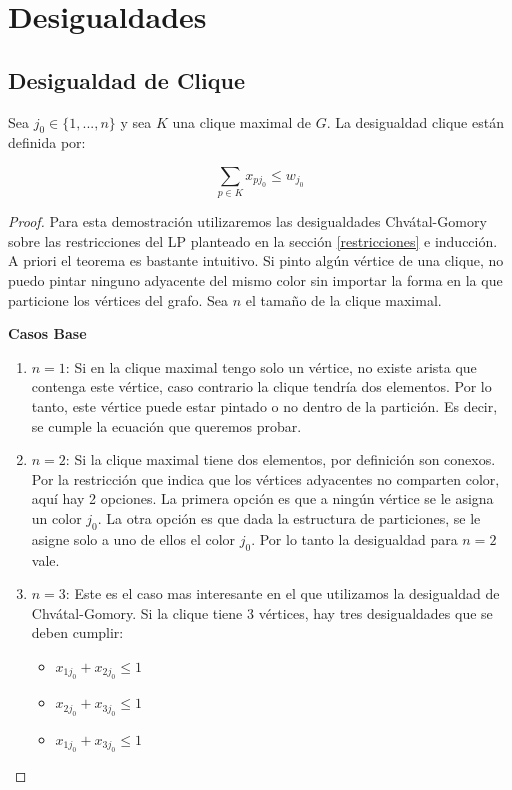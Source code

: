 \section{Desigualdades}

\subsection{Desigualdad de Clique}

Sea $j_0 \in \{1,...,n\}$ y sea $K$ una clique maximal de $G$. La desigualdad clique están definida por:

\begin{equation}
\sum_{p \in K} x_{pj_0} \leq w_{j_0}
\end{equation}

\begin{proof}
Para esta demostración utilizaremos las desigualdades Chvátal-Gomory sobre las restricciones del LP planteado en la sección \ref{restricciones} e inducción. A priori el teorema es bastante intuitivo. Si pinto algún vértice de una clique, no puedo pintar ninguno adyacente del mismo color sin importar la forma en la que particione los vértices del grafo. Sea $n$ el tamaño de la clique maximal.

\hfill

\textbf{Casos Base}
\begin{enumerate}
\item $n=1$: Si en la clique maximal tengo solo un vértice, no existe arista que contenga este vértice, caso contrario la clique tendría dos elementos. Por lo tanto, este vértice puede estar pintado o no dentro de la partición. Es decir, se cumple la ecuación que queremos probar.
\item $n=2$: Si la clique maximal tiene dos elementos, por definición son conexos. Por la restricción que indica que los vértices adyacentes no comparten color, aquí hay 2 opciones. La primera opción es que a ningún vértice se le asigna un color $j_0$. La otra opción es que dada la estructura de particiones, se le asigne solo a uno de ellos el color $j_0$. Por lo tanto la desigualdad para $n=2$ vale.
\item $n=3$: Este es el caso mas interesante en el que utilizamos la desigualdad de Chvátal-Gomory. Si la clique tiene 3 vértices, hay tres desigualdades que se deben cumplir:

\begin{itemize}
\item $x_{1j_0} + x_{2j_0} \leq 1$
\item $x_{2j_0} + x_{3j_0} \leq 1$
\item $x_{1j_0} + x_{3j_0} \leq 1$
\end{itemize}


\end{enumerate}
\end{proof}
